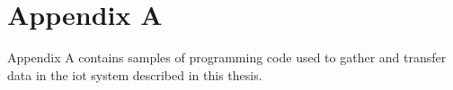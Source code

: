 \chapter{Appendix A}
\label{chp:appendix}

Appendix A contains samples of programming code used to gather and transfer data in the \gls{iot} system described in this thesis. 

